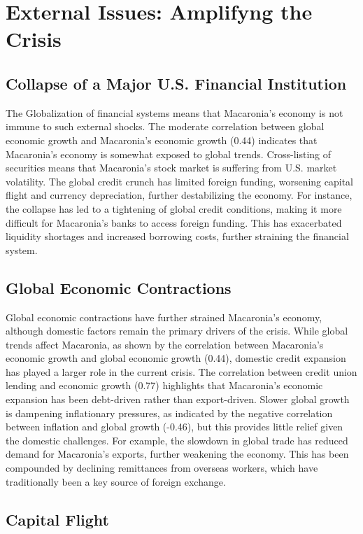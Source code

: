 
\section{External Issues: Amplifyng the Crisis}

\subsection{ Collapse of a Major U.S. Financial Institution}


The Globalization of financial systems means that Macaronia’s economy is not immune to such external shocks. The moderate correlation between global economic growth and Macaronia’s economic growth (0.44) indicates that Macaronia's economy is somewhat exposed to global trends. Cross-listing of securities means that Macaronia's stock market is suffering from U.S. market volatility. The global credit crunch has limited foreign funding, worsening capital flight and currency depreciation, further destabilizing the economy.
For instance, the collapse has led to a tightening of global credit conditions, making it more difficult for Macaronia’s banks to access foreign funding. This has exacerbated liquidity shortages and increased borrowing costs, further straining the financial system.


\subsection{Global Economic Contractions}
Global economic contractions have further strained Macaronia's economy, although domestic factors remain the primary drivers of the crisis. While global trends affect Macaronia, as shown by the correlation between Macaronia's economic growth and global economic growth (0.44), domestic credit expansion has played a larger role in the current crisis. The correlation between credit union lending and economic growth (0.77) highlights that Macaronia's economic expansion has been debt-driven rather than export-driven. Slower global growth is dampening inflationary pressures, as indicated by the negative correlation between inflation and global growth (-0.46), but this provides little relief given the domestic challenges.
For example, the slowdown in global trade has reduced demand for Macaronia’s exports, further weakening the economy. This has been compounded by declining remittances from overseas workers, which have traditionally been a key source of foreign exchange.
\subsection{Capital Flight}

